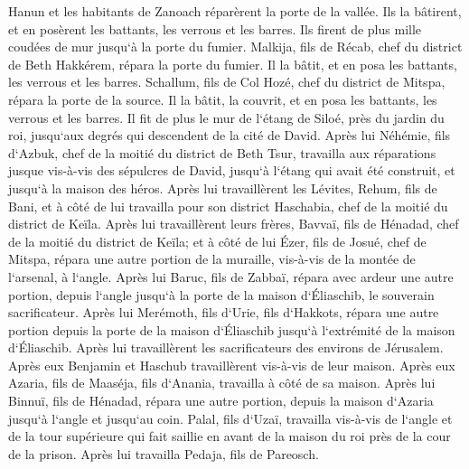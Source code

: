 \verse Hanun et les habitants de Zanoach réparèrent la porte de la vallée. Ils la bâtirent, et en posèrent les battants, les verrous et les barres. Ils firent de plus mille coudées de mur jusqu`à la porte du fumier. 
\verse Malkija, fils de Récab, chef du district de Beth Hakkérem, répara la porte du fumier. Il la bâtit, et en posa les battants, les verrous et les barres. 
\verse Schallum, fils de Col Hozé, chef du district de Mitspa, répara la porte de la source. Il la bâtit, la couvrit, et en posa les battants, les verrous et les barres. Il fit de plus le mur de l`étang de Siloé, près du jardin du roi, jusqu`aux degrés qui descendent de la cité de David. 
\verse Après lui Néhémie, fils d`Azbuk, chef de la moitié du district de Beth Tsur, travailla aux réparations jusque vis-à-vis des sépulcres de David, jusqu`à l`étang qui avait été construit, et jusqu`à la maison des héros. 
\verse Après lui travaillèrent les Lévites, Rehum, fils de Bani, et à côté de lui travailla pour son district Haschabia, chef de la moitié du district de Keïla. 
\verse Après lui travaillèrent leurs frères, Bavvaï, fils de Hénadad, chef de la moitié du district de Keïla; 
\verse et à côté de lui Ézer, fils de Josué, chef de Mitspa, répara une autre portion de la muraille, vis-à-vis de la montée de l`arsenal, à l`angle. 
\verse Après lui Baruc, fils de Zabbaï, répara avec ardeur une autre portion, depuis l`angle jusqu`à la porte de la maison d`Éliaschib, le souverain sacrificateur. 
\verse Après lui Merémoth, fils d`Urie, fils d`Hakkots, répara une autre portion depuis la porte de la maison d`Éliaschib jusqu`à l`extrémité de la maison d`Éliaschib. 
\verse Après lui travaillèrent les sacrificateurs des environs de Jérusalem. 
\verse Après eux Benjamin et Haschub travaillèrent vis-à-vis de leur maison. Après eux Azaria, fils de Maaséja, fils d`Anania, travailla à côté de sa maison. 
\verse Après lui Binnuï, fils de Hénadad, répara une autre portion, depuis la maison d`Azaria jusqu`à l`angle et jusqu`au coin. 
\verse Palal, fils d`Uzaï, travailla vis-à-vis de l`angle et de la tour supérieure qui fait saillie en avant de la maison du roi près de la cour de la prison. Après lui travailla Pedaja, fils de Pareosch. 
